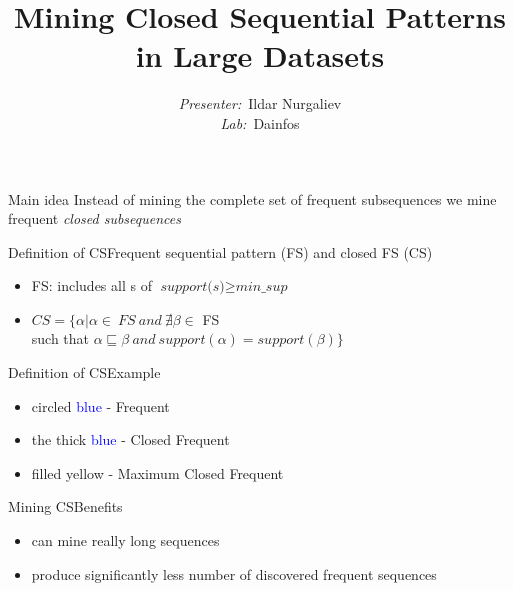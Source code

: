 \documentclass[12pt]{beamer}
\title{\fontsize{15}{15}\selectfont
	\textbf{Mining Closed Sequential Patterns in Large Datasets
}}
\author{
	\fontvi
	\small{%
\emph{Presenter:}~Ildar Nurgaliev\\%
\emph{Lab:}~Dainfos}\\%
}
\date{}
\begin{document}
\maketitle

\begin{frame}{Main idea}
  Instead of mining the complete set of frequent subsequences we mine frequent \textit{closed subsequences}
\end{frame}

\begin{frame}{Definition of CS}{Frequent sequential pattern (FS) and closed FS (CS)}
\begin{itemize}
\item FS: includes all s of $\textit{support(s)} \ge \textit{min\_sup}$
\item $CS = \{ \alpha|\alpha \in~FS~and~\nexists\beta \in$ FS\\such that $\alpha \sqsubseteq \beta~and~support(\alpha) = support(\beta)\}$
\end{itemize}
\end{frame}

\begin{frame}{Definition of CS}{Example}
\begin{figure}
\end{figure}
\begin{itemize}
  \item circled \textcolor{blue}{blue} - Frequent
  \item the thick \textcolor{blue}{blue} - Closed Frequent
  \item filled yellow - Maximum Closed Frequent
\end{itemize}
\end{frame}

\begin{frame}{Mining CS}{Benefits}
\begin{itemize}
\item can mine really long sequences
\item produce significantly less number of discovered frequent sequences
\end{itemize}
\end{frame}
\end{document}
